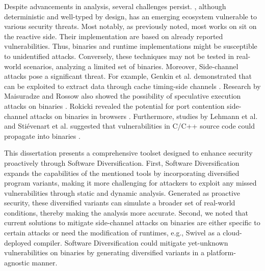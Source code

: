 Despite advancements in \Wasm analysis, several challenges persist.
\Wasm, although deterministic and well-typed by design, has an emerging ecosystem vulnerable to various security threats.
Most notably, as previously noted, most works on \Wasm sit on the reactive side.
Their implementation are based on already reported vulnerabilities.
Thus, \Wasm binaries and runtime implementations might be susceptible to unidentified attacks.
Conversely, these techniques may not be tested in real-world scenarios, analyzing a limited set of \Wasm binaries.
Moreover, Side-channel attacks pose a significant threat.
For example, Genkin et al. demonstrated that \Wasm can be exploited to extract data through cache timing-side channels \cite{Genkin2018DrivebyKC}. 
Research by Maisuradze and Rossow also showed the possibility of speculative execution attacks on \Wasm binaries \cite{ret2spec}. 
Rokicki \etal revealed the potential for port contention side-channel attacks on \Wasm binaries in browsers \cite{10.1145/3488932.3517411}.
Furthermore, studies by Lehmann et al. and Stiévenart et al. suggested that vulnerabilities in C/C++ source code could propagate into \Wasm binaries \cite{usenixWasm2020, DeRoover2022}. 


This dissertation presents a comprehensive toolset designed to enhance \Wasm security proactively through Software Diversification.
First, Software Diversification expands the capabilities of the mentioned tools by incorporating diversified program variants, making it more challenging for attackers to exploit any missed vulnerabilities through static and dynamic analysis.
Generated as proactive security, these diversified variants can simulate a broader set of real-world conditions, thereby making the analysis more accurate. 
Second, we noted that current solutions to mitigate side-channel attacks on \Wasm binaries are either specific to certain attacks or need the modification of runtimes, e.g., Swivel as a cloud-deployed compiler.
Software Diversification could mitigate yet-unknown vulnerabilities on \Wasm binaries by generating diversified variants in a platform-agnostic manner.
